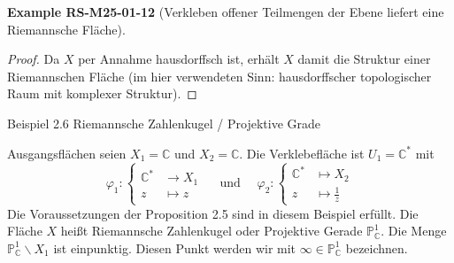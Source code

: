 \documentclass[10pt, letterpaper]{article}
\newcommand{\CustomHeading}[3]{%
  \par\medskip\noindent%
  \textbf{#1 #2} \textnormal{(#3)}.\enskip%
}
\newenvironment{EXA}[2]{\begin{unitbox}\CustomHeading{Example}{#1}{#2}}{\end{unitbox}}
\begin{document}
\begin{EXA}{RS-M25-01-12}{Verkleben offener Teilmengen der Ebene liefert eine Riemannsche Fläche}
\begin{proof}
Da $X$ per Annahme hausdorffsch ist, erhält $X$ damit die Struktur einer Riemannschen Fläche (im hier verwendeten Sinn:
hausdorffscher topologischer Raum mit komplexer Struktur).
\end{proof}
\end{EXA}



Beispiel 2.6  Riemannsche Zahlenkugel / Projektive Grade

Ausgangsflächen seien $X_{1}=\mathbb{C}$ und $X_{2}=\mathbb{C}$. Die Verklebefläche ist $U_{1}=\mathbb{C}^{*}$ mit
$$
\varphi_{1}:\left\{\begin{array}{rlc}
\mathbb{C}^{*} & \longrightarrow X_{1} \\
z & \longmapsto z
\end{array} \quad \text { und } \quad \varphi_{2}:\left\{\begin{array}{rll}
\mathbb{C}^{*} & \longmapsto X_{2} \\
z & \longmapsto \frac{1}{z}
\end{array}\right.\right.
$$
Die Voraussetzungen der Proposition 2.5 sind in diesem Beispiel erfüllt. Die Fläche $X$ heißt Riemannsche Zahlenkugel oder Projektive Gerade $\mathbb{P}_{\mathbb{C}}^{1}$. Die Menge $\mathbb{P}_{\mathbb{C}}^{1} \backslash X_{1}$ ist einpunktig. Diesen Punkt werden wir mit $\infty \in \mathbb{P}_{\mathbb{C}}^{1}$ bezeichnen.
\end{document}

